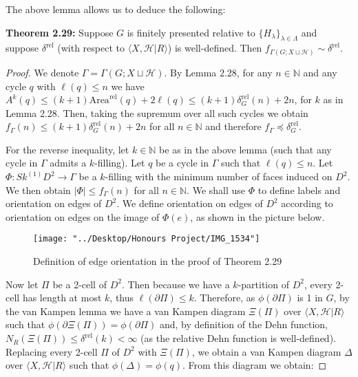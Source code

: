 \documentclass[12pt]{article}
\newcommand{\vs}{\vskip10pt}
\begin{document}
	The above lemma allows us to deduce the following: 
	
	\vs
	
	\textbf{Theorem 2.29: } Suppose $G$ is finitely presented relative to $\{H_{\lambda}\}_{\lambda \in \Lambda}$ and suppose $\delta^{\text{rel}}$ (with respect to $\langle X, \mathcal{H} \vert R \rangle$) is well-defined. Then $f_{\Gamma(G; X \sqcup \mathcal{H})} \sim \delta^{\text{rel}}$. 
	
	\begin{proof}
		
		We denote $\Gamma = \Gamma(G; X \sqcup \mathcal{H})$. By Lemma 2.28, for any $n \in \mathbb{N}$ and any cycle $q$ with $\ell(q) \leq n$ we have $A^{k}(q) \leq (k+1) \text{Area}^{\text{rel}}(q) + 2 \ell(q) \leq (k+1) \delta_G^{\text{rel}}(n) + 2n$, for $k$ as in Lemma 2.28. Then, taking the supremum over all such cycles we obtain $f_{\Gamma} (n) \leq (k+1) \delta_G^{\text{rel}}(n) + 2n$ for all $n \in \mathbb{N}$ and therefore $f_{\Gamma} \preccurlyeq \delta_G^{\text{rel}}$. 
		
		\vs 
		
		For the reverse inequality, let $k \in \mathbb{N}$ be as in the above lemma (such that any cycle in $\Gamma$ admits a $k$-filling). Let $q$ be a cycle in $\Gamma$ such that $\ell(q) \leq n$. Let $\Phi: Sk^{(1)} D^2 \rightarrow \Gamma$ be a $k$-filling with the minimum number of faces induced on $D^2$. We then obtain $\vert \Phi \vert \leq f_{\Gamma}(n)$ for all $n \in \mathbb{N}$. We shall use $\Phi$ to define labels and orientation on edges of $D^2$. We define orientation on edges of $D^2$ according to orientation on edges on the image of $\Phi(e)$, as shown in the picture below. 
		
		\begin{figure} [H]
			\centering
			\texttt{[image: "../Desktop/Honours Project/IMG\_1534"]}
			\caption{Definition of edge orientation in the proof of Theorem 2.29}
			\label{fig:img1534}
		\end{figure}
		
		\vs 
		
		Now let $\Pi$ be a 2-cell of $D^2$. Then because we have a $k$-partition of $D^2$, every 2-cell has length at most $k$, thus $\ell(\partial \Pi) \leq k$. Therefore, as $\phi(\partial \Pi)$ is 1 in $G$, by the van Kampen lemma we have a van Kampen diagram $\Xi(\Pi)$ over $\langle X, \mathcal{H} \vert R \rangle$ such that $\phi(\partial \Xi(\Pi)) = \phi(\partial \Pi)$ and, by definition of the Dehn function, $N_{R} (\Xi(\Pi)) \leq \delta^{\text{rel}}(k) < \infty$ (as the relative Dehn function is well-defined). Replacing every 2-cell $\Pi$ of $D^2$ with $\Xi(\Pi)$, we obtain a van Kampen diagram $\Delta$ over $\langle X, \mathcal{H} \vert R \rangle$ such that $\phi(\Delta) = \phi(q)$. From this diagram we obtain: 
		

\end{proof}
\end{document}
